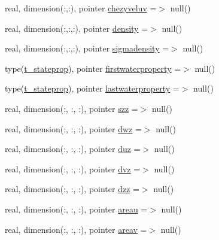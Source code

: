 \begin{DoxyCompactItemize}
\item 
real, dimension(\+:,\+:), pointer \mbox{\hyperlink{structmodulesequentialassimilation_1_1t__fullstate_ab74f080c39ea10f6d36a470ceededaa0}{chezyveluv}} =$>$ null()
\item 
real, dimension(\+:,\+:,\+:), pointer \mbox{\hyperlink{structmodulesequentialassimilation_1_1t__fullstate_a55d261412dd48d0fdfeabeaa483e9ef3}{density}} =$>$ null()
\item 
real, dimension(\+:,\+:,\+:), pointer \mbox{\hyperlink{structmodulesequentialassimilation_1_1t__fullstate_ade9ceedcf1090c85946bf7d2e65f0ede}{sigmadensity}} =$>$ null()
\item 
type(\mbox{\hyperlink{structmodulesequentialassimilation_1_1t__stateprop}{t\+\_\+stateprop}}), pointer \mbox{\hyperlink{structmodulesequentialassimilation_1_1t__fullstate_a8b69d19d55dde2c6e5e62cb918b59d2f}{firstwaterproperty}} =$>$ null()
\item 
type(\mbox{\hyperlink{structmodulesequentialassimilation_1_1t__stateprop}{t\+\_\+stateprop}}), pointer \mbox{\hyperlink{structmodulesequentialassimilation_1_1t__fullstate_a1a5b9d547e78dbd355b4c11dfd5cc103}{lastwaterproperty}} =$>$ null()
\item 
real, dimension(\+:, \+:, \+:), pointer \mbox{\hyperlink{structmodulesequentialassimilation_1_1t__fullstate_aa6f5963f6cf961a6a436add829a315fc}{szz}} =$>$ null()
\item 
real, dimension(\+:, \+:, \+:), pointer \mbox{\hyperlink{structmodulesequentialassimilation_1_1t__fullstate_a95e474b5b1516ac8ed555b3786fc6a66}{dwz}} =$>$ null()
\item 
real, dimension(\+:, \+:, \+:), pointer \mbox{\hyperlink{structmodulesequentialassimilation_1_1t__fullstate_abdaaea4f77bb97c0a8ecaa1b5da38c6b}{duz}} =$>$ null()
\item 
real, dimension(\+:, \+:, \+:), pointer \mbox{\hyperlink{structmodulesequentialassimilation_1_1t__fullstate_a4738327015c9a04fca728e9cca4d3e9b}{dvz}} =$>$ null()
\item 
real, dimension(\+:, \+:, \+:), pointer \mbox{\hyperlink{structmodulesequentialassimilation_1_1t__fullstate_a70c816cad4d95176afe495ed0a7450ba}{dzz}} =$>$ null()
\item 
real, dimension(\+:, \+:, \+:), pointer \mbox{\hyperlink{structmodulesequentialassimilation_1_1t__fullstate_aeae0ea6aabb4a16717d5c4dd1f14fb55}{areau}} =$>$ null()
\item 
real, dimension(\+:, \+:, \+:), pointer \mbox{\hyperlink{structmodulesequentialassimilation_1_1t__fullstate_ace7ea231668407ae40c6f20d419a88bd}{areav}} =$>$ null()

\end{DoxyCompactItemize}
